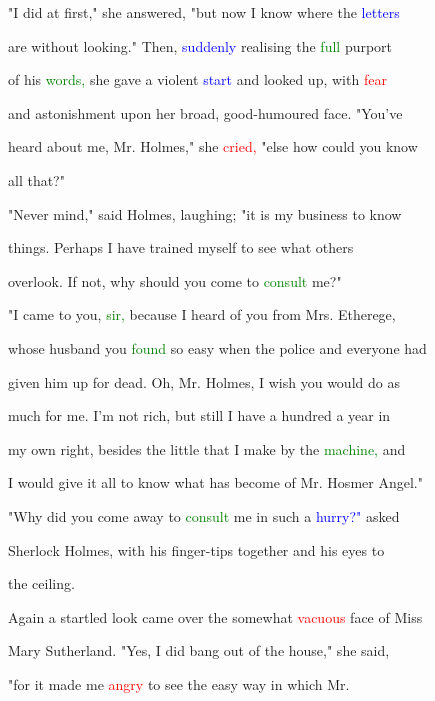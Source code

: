  "I did at first," she answered, "but now I know where the \textcolor{blue}{letters}

 are without looking." Then, \textcolor{blue}{suddenly} realising the \textcolor{green}{full} purport

 of his \textcolor{green}{words,} she gave a \textcolor{BurntOrange}{violent} \textcolor{blue}{start} and looked up, with \textcolor{red}{fear}

 and \textcolor{BurntOrange}{astonishment} upon her broad, good-humoured face. "You've

 heard about me, Mr. Holmes," she \textcolor{red}{cried,} "else how could you know

 all that?"



 "Never mind," said Holmes, \textcolor{BurntOrange}{laughing;} "it is my business to know

 things. Perhaps I have trained myself to see what others

 overlook. If not, why should you come to \textcolor{green}{consult} me?"



 "I came to you, \textcolor{green}{sir,} because I heard of you from Mrs. Etherege,

 whose husband you \textcolor{green}{found} so easy when the \textcolor{BurntOrange}{police} and everyone had

 given him up for dead. Oh, Mr. Holmes, I wish you would do as

 much for me. I'm not rich, but still I have a hundred a year in

 my own right, besides the little that I make by the \textcolor{green}{machine,} and

 I would give it all to know what has become of Mr. Hosmer \textcolor{BurntOrange}{Angel."}



 "Why did you come away to \textcolor{green}{consult} me in such a \textcolor{blue}{hurry?"} asked

 Sherlock Holmes, with his finger-tips together and his eyes to

 the ceiling.



 Again a \textcolor{BurntOrange}{startled} look came over the somewhat \textcolor{red}{vacuous} face of Miss

 Mary Sutherland. "Yes, I did \textcolor{BurntOrange}{bang} out of the house," she said,

 "for it made me \textcolor{red}{angry} to see the easy way in which Mr.

